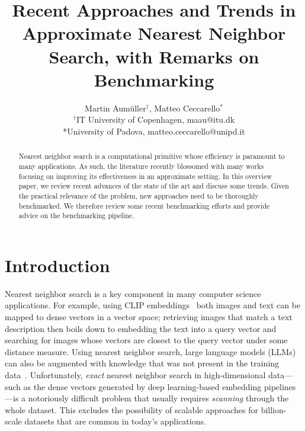 \documentclass[11pt]{article}
\begin{document}
\title{Recent Approaches and Trends in Approximate Nearest Neighbor
	Search, with Remarks on Benchmarking} \date{}

\author{Martin Aum\"uller$^\dagger$, Matteo Ceccarello$^*$\\ $^\dagger$IT
	University of Copenhagen, maau@itu.dk \\ *University of Padova,
	matteo.ceccarello@unipd.it }



\maketitle \renewcommand\thesection{\arabic{section}}
\setcounter{section}{0} \setcounter{figure}{0} \setcounter{table}{0}

\begin{abstract}

	Nearest neighbor search is a computational primitive whose efficiency is
	paramount to many applications. As such, the literature recently blossomed
	with many works focusing on improving its effectiveness in an approximate setting.
	In this overview paper, we
	review recent advances of the state of the art and discuss some trends.
	Given the practical relevance of the problem, new approaches need to be
	thoroughly benchmarked. We therefore review some recent benchmarking efforts and
	provide advice on the benchmarking pipeline.
\end{abstract}

\section{Introduction}\label{matteo_sec:introduction}

Nearest neighbor search is a key component in many computer science applications.
For example, using CLIP embeddings~\cite{DBLP:conf/icml/RadfordKHRGASAM21} both images and text can be mapped to dense vectors in a vector space; retrieving images that match a text description then boils down to embedding the text into a query vector and searching for images whose vectors are closest to the query vector under some distance measure.
Using nearest neighbor search, large language models (LLMs) can also be augmented with knowledge that was not present in the training data~\cite{DBLP:conf/iclr/KhandelwalLJZL20}.
Unfortunately, \emph{exact} nearest neighbor search in high-dimensional data---such as the dense vectors generated by deep learning-based embedding pipelines---is a notoriously difficult problem that usually requires \emph{scanning} through the whole dataset.
This excludes the possibility of scalable approaches for billion-scale datasets that are common in today's applications.
\end{document}

